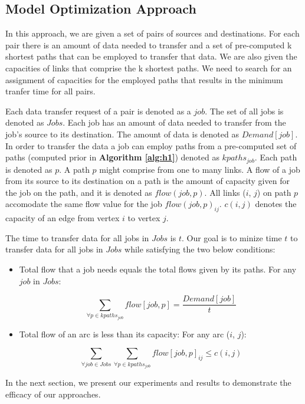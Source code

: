 \subsection{Model Optimization Approach}
\label{sec:optimization}

In this approach, we are given a set of pairs of sources and destinations. For each pair there is an amount of data needed to transfer and a set of pre-computed k shortest paths that can be employed to transfer that data. We are also given the capacities of links that comprise the k shortest paths. We need to search for an assignment of capacities for the employed paths that results in the minimum tranfer time for all pairs. 

Each data transfer request of a pair is denoted as a $job$. The set of all jobs is denoted as $Jobs$. Each job has an amount of data needed to transfer from the job's source to its destination. The amount of data is denoted as $Demand[job]$. In order to transfer the data a job can employ paths from a pre-computed set of paths (computed prior in \textbf{Algorithm \ref{alg:h1}}) denoted as $kpaths_{job}$. Each path is denoted as $p$. A path $p$ might comprise from one to many links. A flow of a job from its source to its destination on a path is the amount of capacity given for the job on the path, and it is denoted as $flow(job, p)$. All links ($i$, $j$) on path $p$ accomodate the same flow value for the job $flow(job, p)_{ij}$. $c(i,j)$ denotes the capacity of an edge from vertex $i$ to vertex $j$.

The time to transfer data for all jobs in $Jobs$ is $t$. Our goal is to minize time $t$ to transfer data for all jobs in $Jobs$ while satisfying the two below conditions:

\begin{itemize}
\item Total flow that a job needs equals the total flows given by its paths. For any $job$ in $Jobs$: 

$$\sum_{\forall p \in kpaths_{job}} flow[job, p] = \frac{Demand[job]}{t}$$

\item Total flow of an arc is less than its capacity: For any arc ($i$, $j$):

$$\sum_{\forall job \in Jobs}\sum_{\forall p \in kpaths_{job}} flow[job, p]_{ij} \leq c(i, j) $$

\end{itemize}

%

In the next section, we present our experiments and results to demonstrate the efficacy of our approaches.
